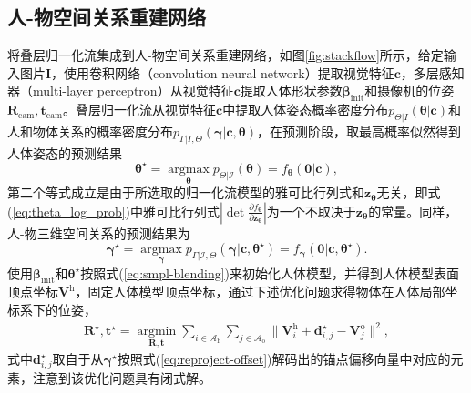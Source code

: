 \subsection{人-物空间关系重建网络}
将叠层归一化流集成到人-物空间关系重建网络，如图\ref{fig:stackflow}所示，给定输入图片$\mathbf{I}$，使用卷积网络（convolution neural network）提取视觉特征$\mathbf{c}$，多层感知器（multi-layer perceptron）从视觉特征$\mathbf{c}$提取人体形状参数$\mathbf{\beta}_{\text{init}}$和摄像机的位姿$\mathbf{R}_{\text{cam}},\mathbf{t}_{\text{cam}}$。叠层归一化流从视觉特征$\mathbf{c}$中提取人体姿态概率密度分布$p_{\Theta|I}(\mathbf{\theta}|\mathbf{c})$和人和物体关系的概率密度分布$p_{\Gamma|I,\Theta}(\mathbf{\gamma}|\mathbf{c},\mathbf{\theta})$，在预测阶段，取最高概率似然得到人体姿态的预测结果
\begin{equation}
	\mathbf{\theta}^\star = \mathop{\arg\max}\limits_{\mathbf{\theta}} p_{\Theta|\mathcal{I}}(\mathbf{\theta}) = f_{\mathbf{\theta}}(\mathbf{0}|\mathbf{c}),
\end{equation}
第二个等式成立是由于所选取的归一化流模型的雅可比行列式和$\mathbf{z}_{\mathbf{\theta}}$无关，即式(\ref{eq:theta_log_prob})中雅可比行列式$\left| \det \frac{\partial f_{\mathbf{\theta}}}{\partial \mathbf{z}_{\mathbf{\theta}}} \right|$为一个不取决于$\mathbf{z}_{\mathbf{\theta}}$的常量。同样，人-物三维空间关系的预测结果为
\begin{equation}\label{eq:gamma-prediction}
	\mathbf{\gamma}^\star = \mathop{\arg\max}\limits_{\mathbf{\gamma}} p_{\Gamma|\mathcal{I},\Theta}(\mathbf{\gamma}|\mathbf{c},\mathbf{\theta}^\star) = f_{\mathbf{\gamma}}(\mathbf{0}|\mathbf{c},\mathbf{\theta}^\star).
\end{equation}
使用$\mathbf{\beta}_{\text{init}}$和$\mathbf{\theta}^\star$按照式(\ref{eq:smpl-blending})来初始化人体模型，并得到人体模型表面顶点坐标$\mathbf{V}^{\text{h}}$，固定人体模型顶点坐标，通过下述优化问题求得物体在人体局部坐标系下的位姿，
\begin{eqnarray}
	\mathbf{R}^\star, \mathbf{t}^\star = \mathop{\arg\min}\limits_{\mathbf{R},\mathbf{t}} \sum_{i\in\mathcal{A}_{\text{h}}}\sum_{j\in\mathcal{A}_\text{o}} \| \mathbf{V}_i^\text{h} + \mathbf{d}_{i,j}^\star - \mathbf{V}_j^\text{o} \|^2,
\end{eqnarray}
式中$\mathbf{d}_{i,j}^\star$取自于从$\mathbf{\gamma}^\star$按照式(\ref{eq:reproject-offset})解码出的锚点偏移向量中对应的元素，注意到该优化问题具有闭式解\citep{Choy_2020_CVPR}。

